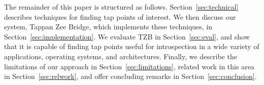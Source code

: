 The remainder of this paper is structured as follows.
Section~\ref{sec:technical} describes techniques for finding tap points
of interest. We then discuss our system, Tappan Zee Bridge, which
implements these techniques, in Section~\ref{sec:implementation}. We
evaluate TZB in Section~\ref{sec:eval}, and show that it is capable of
finding tap points useful for introspection in a wide variety of
applications, operating systems, and architectures. Finally, we describe
the limitations of our approach in Section~\ref{sec:limitations},
related work in this area in Section~\ref{sec:relwork}, and offer
concluding remarks in Section~\ref{sec:conclusion}.
